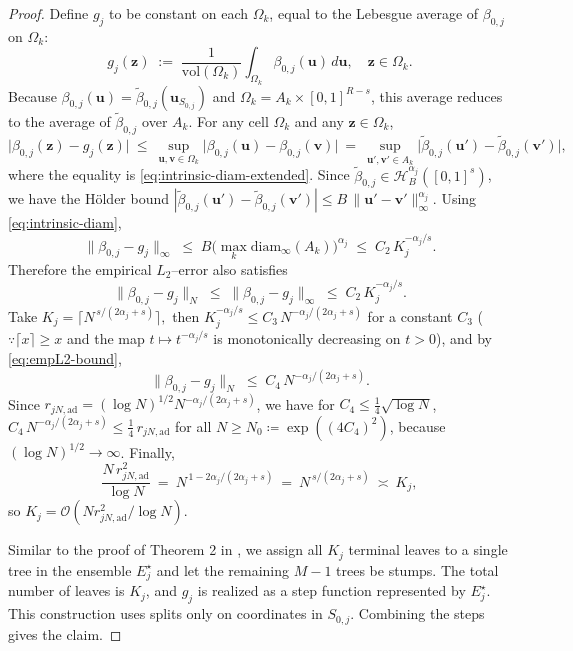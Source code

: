 \documentclass[11pt]{article}
\theoremstyle{plain}
\theoremstyle{definition}
\theoremstyle{plain}
\begin{document}
\begin{proof}
Define $g_j$ to be constant on each $\Omega_k$, equal to the Lebesgue average
of $\beta_{0,j}$ on $\Omega_k$:
\[
g_j(\bm{z}) \;:=\; \frac{1}{\mathrm{vol}(\Omega_k)}\int_{\Omega_k}\beta_{0,j}(\bm{u})\,d\bm{u},
\quad \bm{z}\in\Omega_k.
\]
Because $\beta_{0,j}(\bm{u})=\tilde\beta_{0,j}(\bm{u}_{S_{0,j}})$ and $\Omega_k=A_k\times[0,1]^{R-s}$,
this average reduces to the average of $\tilde\beta_{0,j}$ over $A_k$.
For any cell $\Omega_k$ and any $\bm{z}\in\Omega_k$,
\[
\big|\beta_{0,j}(\bm{z})-g_j(\bm{z})\big|
~\le~
\sup_{\bm{u},\bm{v}\in \Omega_k}\big|\beta_{0,j}(\bm{u})-\beta_{0,j}(\bm{v})\big|
~=~ \sup_{\bm{u'},\bm{v'}\in A_k}\big|\tilde\beta_{0,j}(\bm{u'})-\tilde\beta_{0,j}(\bm{v'})\big|,
\]
where the equality is \eqref{eq:intrinsic-diam-extended}. Since
$\tilde\beta_{0,j}\in \mathcal{H}_B^{\alpha_j}([0,1]^s)$, we have the Hölder bound
$|\tilde\beta_{0,j}(\bm{u}')-\tilde\beta_{0,j}(\bm{v}')|\le B\,\|\bm{u}'-\bm{v}'\|_\infty^{\alpha_j}$.
Using \eqref{eq:intrinsic-diam},
\[
\|\beta_{0,j}-g_j\|_\infty
\;\le\; B\Big(\max_k \mathrm{diam}_\infty(A_k)\Big)^{\alpha_j}
\;\le\; C_2\,K_j^{-\alpha_j/s}.
\]
Therefore the empirical $L_2$–error also satisfies
\begin{equation}\label{eq:empL2-bound}
\|\beta_{0,j}-g_j\|_N \;\le\; \|\beta_{0,j}-g_j\|_\infty
\;\le\; C_2\,K_j^{-\alpha_j/s}.
\end{equation}
Take
\(
K_j = \Big\lceil N^{\,s/(2\alpha_j+s)} \Big\rceil
,\) 
then $K_j^{-\alpha_j/s}\le C_3\,N^{-\alpha_j/(2\alpha_j+s)}$ for a constant $C_3$ ($\because \lceil x\rceil \ge x$ and the map $t \mapsto t^{-\alpha_j/s}$ is monotonically decreasing on $t>0$),
and by \eqref{eq:empL2-bound},
\[
\|\beta_{0,j}-g_j\|_N \;\le\; C_4\,N^{-\alpha_j/(2\alpha_j+s)}.
\]
Since $r_{jN,\mathrm{ad}}=(\log N)^{1/2}N^{-\alpha_j/(2\alpha_j+s)}$, we have for $C_4 \le \frac{1}{4} \sqrt{\log N}$, $C_4\,N^{-\alpha_j/(2\alpha_j+s)} \le \tfrac14\,r_{jN,\mathrm{ad}}$ for all $N\ge N_0 \coloneqq \exp((4C_4)^2)$, because $(\log N)^{1/2}\to\infty$.
Finally,
\[
\frac{N\,r_{jN,\mathrm{ad}}^2}{\log N}
~=~ N^{\,1-2\alpha_j/(2\alpha_j+s)}
~=~ N^{\,s/(2\alpha_j+s)}
~\asymp~ K_j,
\]
so $K_j=\mathcal{O}(N r_{jN,\mathrm{ad}}^2/\log N)$.

Similar to the proof of Theorem 2 in \citet{jeong2023artbartminimaxoptimality}, we assign all $K_j$ terminal leaves to a single tree in the ensemble $E_j^\star$
and let the remaining $M-1$ trees be stumps. The total number
of leaves is $K_j$, and $g_j$ is realized as a step function represented by $E_j^\star$.
This construction uses splits only on coordinates in $S_{0,j}$. Combining the steps gives the claim.
\end{proof}
\end{document}
